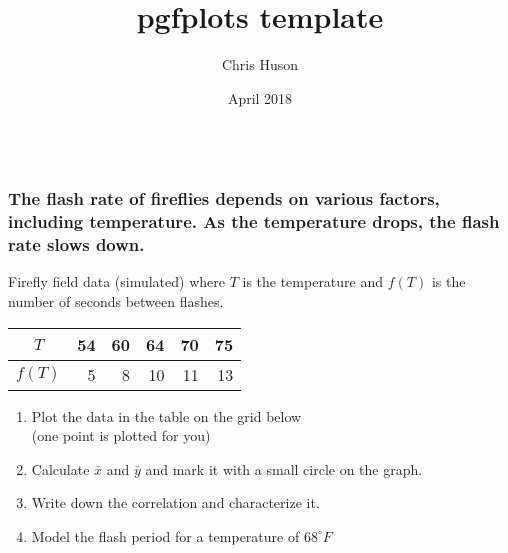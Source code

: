 \documentclass[12pt, oneside]{article}
\title{pgfplots template}
\author{Chris Huson}
\date{April 2018}
\begin{document}
\subsubsection*{\\ \textnormal{The flash rate of fireflies depends on various factors, including temperature. As the temperature drops, the flash rate slows down.
}}



Firefly field data (simulated) where $T$ is the temperature and $f(T)$ is the number of seconds between flashes. \\[10pt]
\begin{tabular}{|c|r|r|r|r|r|}
\hline 
$T$ & 54 & 60 & 64 & 70 & 75 \\ [3pt]
\hline 
$f(T)$ & 5 & 8 & 10 & 11 & 13  \\  [3pt]
\hline 
\end{tabular}
\begin{enumerate}
    \item Plot the data in the table on the grid below \\
    (one point is plotted for you)
    \item Calculate $\bar{x}$ and $\bar{y}$ and mark it with a small circle on the graph.
    \item Write down the correlation and characterize it.\\[10pt]
    \item Model the flash period for a temperature of $68^\circ F$
\end{enumerate}

\vspace{1in}
{}


\end{document}

